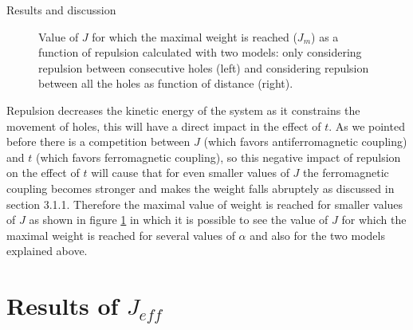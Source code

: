 \documentclass[12pt,twoside]{report}
\begin{document}
\begin{chapter}{Results and discussion}
\begin{figure}[h!]
\begin{minipage}{0.4\textwidth}
		\end{minipage}
		\caption{\label{fig_jv1n} Value of $J$ for which the maximal weight is reached ($J_m$) as a function of repulsion calculated with two models: only considering repulsion between consecutive holes (left) and considering repulsion between all the holes as function of distance (right). }
	\end{figure}
	Repulsion decreases the kinetic energy of the system as it constrains the movement of holes, this will have a direct impact in the effect of $t$. As we pointed before there is a competition between $J$ (which favors antiferromagnetic coupling) and $t$ (which favors ferromagnetic coupling), so this negative impact of repulsion on the effect of $t$ will cause that for even smaller values of $J$ the ferromagnetic coupling becomes stronger and makes the weight falls abruptely as discussed in section 3.1.1. Therefore the maximal value of weight is reached for smaller values of $J$ as shown in figure \ref{fig_jv1n} in which it is possible to see the value of $J$ for which the maximal weight is reached for several values of $\alpha$ and also for the two models explained above.
	
	\section{Results of $J_{eff}$}

\end{chapter}
\end{document}
